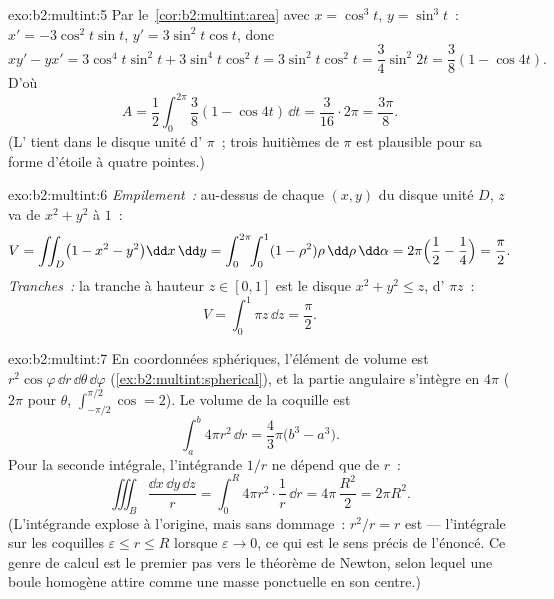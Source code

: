 \begin{solution}{exo:b2:multint:5}
Par le~\cref{cor:b2:multint:area} avec $x = \cos^3 t$, $y = \sin^3 t$~:
$x' = -3\cos^2 t\sin t$, $y' = 3\sin^2 t\cos t$, donc
\[
xy' - yx' = 3\cos^4 t\sin^2 t + 3\sin^4 t\cos^2 t
= 3\sin^2 t\cos^2 t = \frac{3}{4}\sin^2 2t
= \frac{3}{8}(1 - \cos 4t) .
\]
D'où
\[
A = \frac12\int_0^{2\pi}\frac38(1 - \cos 4t)\,\dd t
= \frac{3}{16}\cdot 2\pi = \frac{3\pi}{8} .
\]
(L' tient dans le disque unité d' $\pi$~; trois huitièmes de
$\pi$ est plausible pour sa forme d'étoile à quatre pointes.)
\end{solution}

\begin{solution}{exo:b2:multint:6}
\emph{Empilement~:} au-dessus de chaque $(x, y)$ du disque unité $D$, $z$
va de $x^2 + y^2$ à $1$~:
\[
V = \iint_D \bigl(1 - x^2 - y^2\bigr)\dd x\,\dd y
= \int_0^{2\pi}\!\!\int_0^1 (1 - \rho^2)\rho\,\dd\rho\,\dd\alpha
= 2\pi\Bigl(\frac12 - \frac14\Bigr) = \frac\pi2 .
\]
\emph{Tranches~:} la tranche à hauteur $z \in [0, 1]$ est le disque
$x^2 + y^2 \leq z$, d' $\pi z$~:
\[
V = \int_0^1 \pi z\,\dd z = \frac\pi2 .
\]
\end{solution}

\begin{solution}{exo:b2:multint:7}
En coordonnées sphériques, l'élément de volume est
$r^2\cos\varphi\,\dd r\,\dd\theta\,\dd\varphi$
(\cref{ex:b2:multint:spherical}), et la partie angulaire s'intègre
en $4\pi$ ($2\pi$ pour $\theta$, $\int_{-\pi/2}^{\pi/2}\cos = 2$).
Le volume de la coquille est
\[
\int_a^b 4\pi r^2\,\dd r = \frac43\pi\bigl(b^3 - a^3\bigr).
\]
Pour la seconde intégrale, l'intégrande $1/r$ ne dépend que de $r$~:
\[
\iiint_B \frac{\dd x\,\dd y\,\dd z}{r}
= \int_0^R 4\pi r^2\cdot\frac1r\,\dd r
= 4\pi\,\frac{R^2}{2} = 2\pi R^2 .
\]
(L'intégrande explose à l'origine, mais sans dommage~: $r^2/r = r$
est  --- l'intégrale sur les coquilles $\varepsilon \leq r
\leq R$  lorsque $\varepsilon \to 0$, ce qui est le sens précis
de l'énoncé. Ce genre de calcul est le premier pas vers le théorème de
Newton, selon lequel une boule homogène attire comme une masse
ponctuelle en son centre.)
\end{solution}

